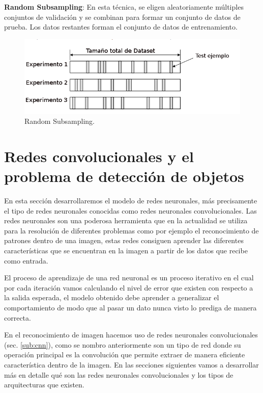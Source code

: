\par \textbf{Random Subsampling}: En esta técnica, se eligen aleatoriamente múltiples conjuntos de validación y se combinan para formar un conjunto de datos de prueba. Los datos restantes forman el conjunto de datos de entrenamiento.

\begin{figure}[H]
 \centering
  \includegraphics[scale=0.5,keepaspectratio=true,clip=true]{imagenes/MarcoTeorico/cross-validation-random.png}
  \caption{Random Subsampling.}%
	\label{Fig: random-Subsampling}
\end{figure}




\section{Redes convolucionales y el problema de detección de objetos}\label{sec:compueter-vision}

En esta sección desarrollaremos el modelo de redes neuronales, más precisamente el tipo de  redes neuronales conocidas como redes neuronales convolucionales. Las redes neuronales son una poderosa herramienta que en la actualidad se utiliza para la resolución de diferentes problemas como por ejemplo el reconocimiento de patrones dentro de una imagen, estas redes consiguen aprender las diferentes características que se encuentran en la imagen a partir de los datos que recibe como entrada. 

El proceso de aprendizaje de una red neuronal es un proceso iterativo en el cual por cada iteración vamos calculando el nivel de error que existen con respecto a la salida esperada, el modelo obtenido debe aprender a generalizar el comportamiento de modo que al pasar un dato nunca visto lo prediga de manera correcta. 

En el reconocimiento de imagen  hacemos uso de redes neuronales convolucionales (sec. \ref{sub:cnn}), como se nombro anteriormente son un tipo de red donde su operación principal es la convolución que permite extraer de manera eficiente característica dentro de la imagen. En las secciones siguientes vamos a desarrollar más en detalle qué son las redes neuronales convolucionales y los tipos de arquitecturas que existen. 


